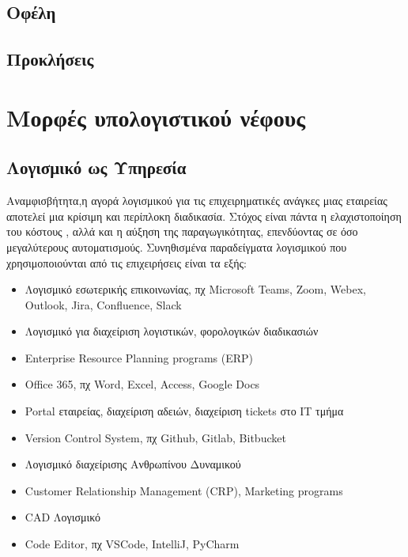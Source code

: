\documentclass{article}
\begin{document}
\subsection{Οφέλη}
\subsection{Προκλήσεις}
\section{Μορφές υπολογιστικού νέφους}
\newpage
\subsection{Λογισμικό ως Υπηρεσία}
Αναμφισβήτητα,η αγορά λογισμικού για τις επιχειρηματικές ανάγκες μιας εταιρείας αποτελεί μια κρίσιμη και περίπλοκη διαδικασία. Στόχος είναι πάντα η ελαχιστοποίηση του κόστους , αλλά και η αύξηση της παραγωγικότητας, επενδύοντας σε όσο μεγαλύτερους αυτοματισμούς. Συνηθισμένα παραδείγματα λογισμικού που χρησιμοποιούνται από τις επιχειρήσεις είναι τα εξής:
\begin{itemize}
  \item Λογισμικό εσωτερικής επικοινωνίας, πχ  Microsoft Teams, Zoom, Webex, Outlook, Jira, Confluence, Slack
  \item Λογισμικό για διαχείριση λογιστικών, φορολογικών διαδικασιών
  \item {} Enterprise Resource Planning programs (ERP)
  \item Office 365, πχ Word, Excel, Access, Google Docs
  \item Portal  εταιρείας, διαχείριση αδειών, διαχείριση tickets στο ΙΤ τμήμα 
  \item Version Control System, πχ Github, Gitlab, Bitbucket 
  \item Λογισμικό διαχείρισης Ανθρωπίνου Δυναμικού 
  \item Customer Relationship Management (CRP), Marketing programs
  \item CAD Λογισμικό
  \item Code Editor, πχ VSCode, IntelliJ, PyCharm

\end{itemize}
\end{document}
